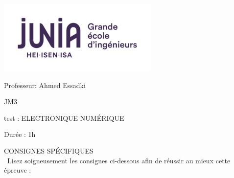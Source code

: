 \documentclass{book}%
\begin{document}
%
\normalsize%
\newpage%
\thispagestyle{empty}%
\vskip-40mm	\includegraphics[scale=0.5]{logo.png} \\%
 \begin{flushright}  \vskip-20mm   Professeur: Ahmed Essadki\vskip15mm  \end{flushright}%
JM3%
\begin{center}   \begin{Large}test : ELECTRONIQUE NUMÉRIQUE\end{Large} \end{center}%
Durée : 1h%
 \begin{center} { \large CONSIGNES SPÉCIFIQUES } \\\ Lisez soigneusement les consignes ci-dessous afin de réussir au mieux cette épreuve : \end{center} %
\end{document}
